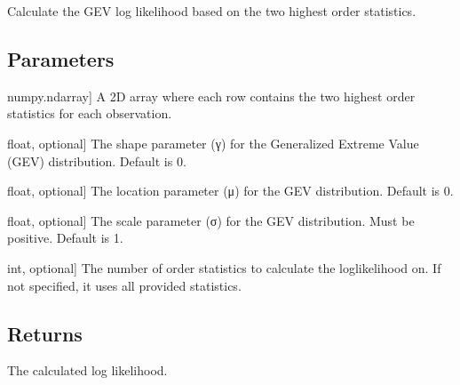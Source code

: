 \documentclass[a4paper,11pt,openany,english]{sphinxmanual}
\begin{document}

\begin{fulllineitems}
\label{\detokenize{api_topt:xtremes.topt.log_likelihood}}
\pysigstartsignatures
{}
\pysigstopsignatures
\sphinxAtStartPar
Calculate the GEV log likelihood based on the two highest order statistics.


\subsection{Parameters}
\label{\detokenize{api_topt:id82}}\begin{description}
\sphinxlineitem{high\_order\_statistics}{[}numpy.ndarray{]}
\sphinxAtStartPar
A 2D array where each row contains the two highest order statistics for each observation.

\sphinxlineitem{gamma}{[}float, optional{]}
\sphinxAtStartPar
The shape parameter (γ) for the Generalized Extreme Value (GEV) distribution. Default is 0.

\sphinxlineitem{mu}{[}float, optional{]}
\sphinxAtStartPar
The location parameter (μ) for the GEV distribution. Default is 0.

\sphinxlineitem{sigma}{[}float, optional{]}
\sphinxAtStartPar
The scale parameter (σ) for the GEV distribution. Must be positive. Default is 1.

\sphinxlineitem{r}{[}int, optional{]}
\sphinxAtStartPar
The number of order statistics to calculate the log\sphinxhyphen{}likelihood on. If not specified, it uses all provided statistics.

\end{description}


\subsection{Returns}
\label{\detokenize{api_topt:id83}}\begin{description}
\sphinxAtStartPar
The calculated log likelihood.


\end{description}
\end{fulllineitems}
\end{document}
